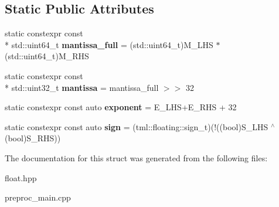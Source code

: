\subsection*{Static Public Attributes}
\begin{DoxyCompactItemize}
\item 
\hypertarget{structtml_1_1mul_3_01tml_1_1floating_1_1number_3_01S__LHS_00_01E__LHS_00_01M__LHS_01_4_00_01tml_6cdb98003dbb0187b3ecd108f86a2e4f_a2754ccad111fd72445bac3f423708d2f}{static constexpr const \\*
std\+::uint64\+\_\+t {\bfseries mantissa\+\_\+full} = (std\+::uint64\+\_\+t)M\+\_\+\+L\+H\+S $\ast$ (std\+::uint64\+\_\+t)M\+\_\+\+R\+H\+S}\label{structtml_1_1mul_3_01tml_1_1floating_1_1number_3_01S__LHS_00_01E__LHS_00_01M__LHS_01_4_00_01tml_6cdb98003dbb0187b3ecd108f86a2e4f_a2754ccad111fd72445bac3f423708d2f}

\item 
\hypertarget{structtml_1_1mul_3_01tml_1_1floating_1_1number_3_01S__LHS_00_01E__LHS_00_01M__LHS_01_4_00_01tml_6cdb98003dbb0187b3ecd108f86a2e4f_a862eb7fc315fa17365bcf33dfff18fe9}{static constexpr const \\*
std\+::uint32\+\_\+t {\bfseries mantissa} = mantissa\+\_\+full $>$$>$ 32}\label{structtml_1_1mul_3_01tml_1_1floating_1_1number_3_01S__LHS_00_01E__LHS_00_01M__LHS_01_4_00_01tml_6cdb98003dbb0187b3ecd108f86a2e4f_a862eb7fc315fa17365bcf33dfff18fe9}

\item 
\hypertarget{structtml_1_1mul_3_01tml_1_1floating_1_1number_3_01S__LHS_00_01E__LHS_00_01M__LHS_01_4_00_01tml_6cdb98003dbb0187b3ecd108f86a2e4f_a9cc446db23da2881a16b9d0f6023cf2c}{static constexpr const auto {\bfseries exponent} = E\+\_\+\+L\+H\+S+E\+\_\+\+R\+H\+S + 32}\label{structtml_1_1mul_3_01tml_1_1floating_1_1number_3_01S__LHS_00_01E__LHS_00_01M__LHS_01_4_00_01tml_6cdb98003dbb0187b3ecd108f86a2e4f_a9cc446db23da2881a16b9d0f6023cf2c}

\item 
\hypertarget{structtml_1_1mul_3_01tml_1_1floating_1_1number_3_01S__LHS_00_01E__LHS_00_01M__LHS_01_4_00_01tml_6cdb98003dbb0187b3ecd108f86a2e4f_a656826fe7625cddf92b9456b9bba8986}{static constexpr const auto {\bfseries sign} = (tml\+::floating\+::sign\+\_\+t)(!((bool)S\+\_\+\+L\+H\+S $^\wedge$ (bool)S\+\_\+\+R\+H\+S))}\label{structtml_1_1mul_3_01tml_1_1floating_1_1number_3_01S__LHS_00_01E__LHS_00_01M__LHS_01_4_00_01tml_6cdb98003dbb0187b3ecd108f86a2e4f_a656826fe7625cddf92b9456b9bba8986}

\end{DoxyCompactItemize}


The documentation for this struct was generated from the following files\+:\begin{DoxyCompactItemize}
\item 
float.\+hpp\item 
preproc\+\_\+main.\+cpp\end{DoxyCompactItemize}
